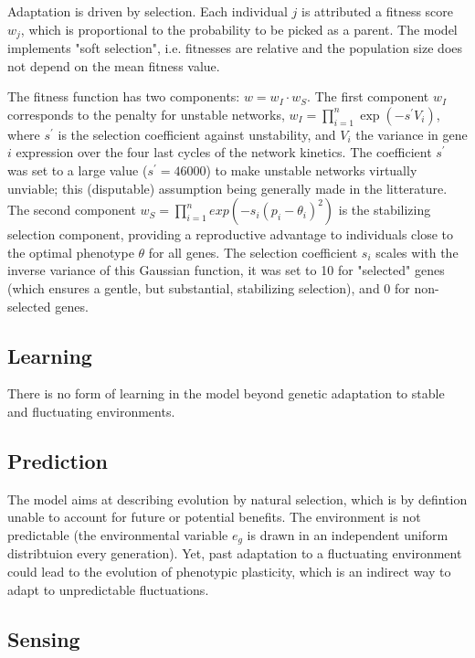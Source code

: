 \documentclass{article}
\begin{document}
Adaptation is driven by selection. Each individual $j$ is attributed a fitness score $w_j$, which is proportional to the probability to be picked as a parent. The model implements "soft selection", i.e. fitnesses are relative and the population size does not depend on the mean fitness value. 

The fitness function has two components: $w = w_I \cdot w_S$. The first component $w_I$ corresponds to the penalty for unstable networks, $w_I = \prod_{i=1}^n \exp(-s^\prime V_i)$, where $s^\prime$ is the selection coefficient against unstability, and $V_i$ the variance in gene $i$ expression over the four last cycles of the network kinetics. The coefficient $s^\prime$ was set to a large value ($s^\prime=46000$) to make unstable networks virtually unviable; this (disputable) assumption being generally made in the litterature. The second component $w_S = \prod_{i=1}^n exp(-s_i(p_i-\theta_i)^2)$ is the stabilizing selection component, providing a reproductive advantage to individuals close to the optimal phenotype $\theta$ for all genes. The selection coefficient $s_i$ scales with the inverse variance of this Gaussian function, it was set to 10 for "selected" genes (which ensures a gentle, but substantial, stabilizing selection), and 0 for non-selected genes. 

\subsection{Learning}

There is no form of learning in the model beyond genetic adaptation to stable and fluctuating environments. 

\subsection{Prediction}

The model aims at describing evolution by natural selection, which is by defintion unable to account for future or potential benefits. The environment is not predictable (the environmental variable $e_g$ is drawn in an independent uniform distribtuion every generation). Yet, past adaptation to a fluctuating environment could lead to the evolution of phenotypic plasticity, which is an indirect way to adapt to unpredictable fluctuations. 

\subsection{Sensing}
\end{document}
